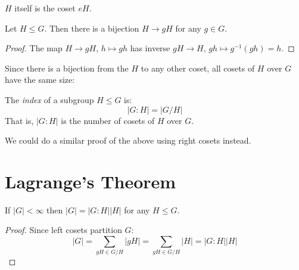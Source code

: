 \documentclass[../main.tex]{subfiles}
\begin{document}
\begin{remark}[Note]
  $H$ itself is the coset $eH$.
\end{remark}
\begin{lemma}
  Let $H \leq G$.
  Then there is a bijection $H \to gH$ for any $g \in G$.
\end{lemma}
\begin{proof}
  The map $H \to gH$, $h \mapsto gh$ has inverse $gH \to H$, $gh \mapsto g^{-1}(gh) = h$.
\end{proof}
Since there is a bijection from the $H$ to any other coset, all cosets of $H$ over $G$ have the same size:
\begin{center}
\end{center}

\begin{definition}[Index]
  The \textit{index} of a subgroup $H \leq G$ is:
  \[
    |G : H| = |G / H|
  \]
  That is, $|G : H|$ is the number of cosets of $H$ over $G$.
\end{definition}
\begin{remark}
  We could do a similar proof of the above using right cosets instead.
\end{remark}

\section{Lagrange's Theorem}
\begin{theorem}
  If $|G| < \infty$ then $|G| = |G : H| |H|$ for any $H \leq G$.
  \label{lagrangesTheorem}
\end{theorem}
\begin{proof}
  Since left cosets partition $G$:
  \[
    |G| = \sum_{gH \in G / H} |gH| = \sum_{gH \in G / H} |H| = |G : H||H|
  \]
\end{proof}
\end{document}
